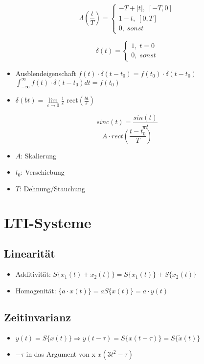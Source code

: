 \documentclass{article}
\begin{document}
$$
\Lambda(\frac{t}{T})=
\begin{cases}
-T+|t|, \;[-T, 0] \\
1-t, \;  [0,T] \\
0, \;sonst
\end{cases}
$$

$$
\delta(t)=
\begin{cases}
1, \;t = 0\\
0, \;sonst
\end{cases}
$$
\begin{itemize}
\item Ausblendeigenschaft $f(t)\cdot\delta(t-t_0) = f(t_0)\cdot\delta(t-t_0)$ \\  $ \int_{-\infty}^\infty f(t)\cdot \delta(t-t_0) dt = f(t_0)$
\item $\delta(bt) = \lim\limits_{\varepsilon \to 0} \frac{1}{\varepsilon}$ rect$(\frac{bt}{\varepsilon})$
\end{itemize}

$$sinc(t) = \frac{sin(t)}{\pi t}$$
$$A\cdot rect(\frac{t-t_0}{T})$$

\begin{itemize}
\item $A$: Skalierung
\item $t_0$: Verschiebung
\item $T$: Dehnung/Stauchung
\end{itemize}


\section{LTI-Systeme}
\subsection{Linearität}
\begin{itemize}
\item Additivität: $S\{x_1(t) + x_2(t)\} = S\{x_1(t)\} + S\{x_2(t)\}$
\item Homogenität: $\{ a\cdot x(t)\} = a S\{x(t)\} = a\cdot y(t)$
\end{itemize}


\subsection{Zeitinvarianz}
\begin{itemize}
\item $y(t) = S\{x(t)\} \Rightarrow y(t-\tau) = S\{x(t-\tau)\} = S\{\tilde{x}(t)\}$
\item $-\tau$ in das Argument von x $x(3t^2-\tau)$ 
\end{itemize}
\end{document}
